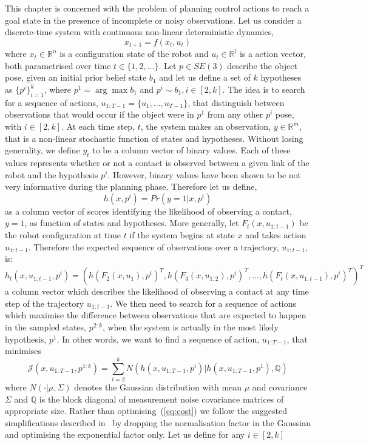 This chapter is concerned with the problem of planning control actions to reach a goal state in the presence of incomplete or noisy observations. 
Let us consider a discrete-time system with continuous non-linear deterministic dynamics, 
$$
x_{t+1}=f(x_t,u_t) 
$$ 
where $x_{t}\in\mathbb{R}^n$ is a configuration state of the robot and $u_{t}\in\mathbb{R}^l$ is a action vector, both parametrised over time $t\in\{1,2,...\}$.
Let $p\in SE(3)$ describe the object pose, given an initial prior belief state $b_1$ and let us define a set of $k$ hypotheses as $\{p^i\}_{i=1}^k$, where $p^1=\arg\max b_1$ and $p^i\sim b_1,i\in[2,k]$. The idea is to search for a sequence of actions, $u_{1:T-1}=\{u_1,\dots,u_{T-1}\}$, that distinguish between observations that would occur if the object were in $p^1$ from any other $p^i$ pose, with $i\in[2,k]$.
At each time step, $t$, the system makes an observation, $y\in\mathbb{R}^m$, that is a non-linear stochastic function of states and hypotheses. 
Without losing generality, we define $y_t$ to be a column vector of binary values. Each of these values represents whether or not a contact is observed between a given link of the robot and the hypothesis $p^i$.
However, binary values have been shown to be not very informative during the planning phase. Therefore let us define,
$$
h(x,p^i)=Pr(y=1|x,p^i)
$$
as a column vector of scores identifying the likelihood of observing a contact, $y=1$, as function of states and hypotheses.
More generally, let $F_t(x,u_{1:t-1})$ be the robot configuration at time $t$ if the system begins at state $x$ and takes action $u_{1:t-1}$. Therefore the expected sequence of observations over a trajectory, $u_{1:t-1}$, is:
$$
h_t(x,u_{1:t-1},p^i)=(h(F_2(x,u_1),p^i)^T,h(F_3(x,u_{1:2}),p^i)^T,\ldots,h(F_t(x,u_{1:t-1}),p^i)^T)^T
$$
a column vector which describes the likelihood of observing a contact at any time step of the trajectory $u_{1:t-1}$.
We then need to search for a sequence of actions which maximise the difference between observations that are expected to happen in the sampled states, $p^{2:k}$, when the system is actually in the most likely hypothesis, $p^1$. In other words, we want to find a sequence of action, $u_{1:T-1}$, that minimises
\begin{equation}\label{eq:cost}
\mathcal{J}(x,u_{1:T-1},p^{1:k})=\sum_{i=2}^kN(h(x,u_{1:T-1},p^i)|h(x,u_{1:T-1},p^1),\mathbb{Q})
\end{equation}
where $N(\cdot|\mu,\Sigma)$ denotes the Gaussian distribution with mean $\mu$ and covariance $\Sigma$ and $\mathbb{Q}$ is the block diagonal of measurement noise covariance matrices of appropriate size. Rather than optimising~(\ref{eq:cost}) we follow the suggested simplifications described in~\citep{bib:platt_csail_2011} by dropping the normalisation factor in the Gaussian and optimising the exponential factor only. Let us define for any $i\in[2,k]$
